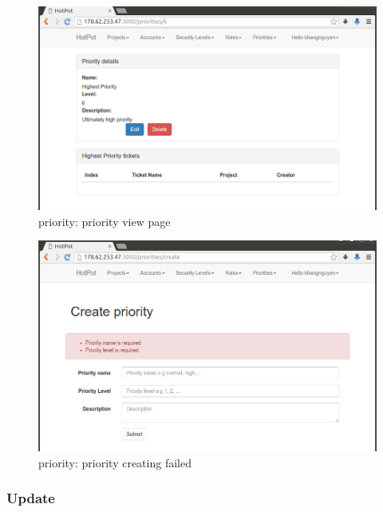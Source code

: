 \begin{figure}[bth]
\myfloatalign
\includegraphics[width=1.0\linewidth]{gfx/chapter_5/priority/priority_view}
\caption[priority: priority view page]{priority: priority view page}
\label{fig:user_guide:priority:priority_view}
\end{figure}

\begin{figure}[bth]
\myfloatalign
\includegraphics[width=1.0\linewidth]{gfx/chapter_5/priority/priority_create_failed}
\caption[priority: priority create]{priority: priority creating failed}
\label{fig:user_guide:priority:priority_create_failed}
\end{figure}

\clearpage

\subsubsection{Update}
\label{ch:result:user_guide:priority:update}

